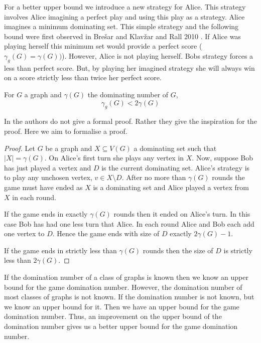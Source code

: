 For a better upper bound we introduce a new strategy for Alice. This strategy involves Alice imagining a perfect play and using this play as a strategy. Alice imagines a minimum dominating set. This simple strategy and the following bound were first observed in Bre\v{s}ar and Klav\v{z}ar and Rall 2010 \cite{BrKlRa2010}. If Alice was playing herself this minimum set would provide a perfect score ($\gamma_g(G)=\gamma(G))$). However, Alice is not playing herself. Bobs strategy forces a less than perfect score. But, by playing her imagined strategy she will always win on a score strictly less than twice her perfect score.

\begin{theorem}\label{thm:gamedomup}
    For $G$ a graph and $\gamma(G)$ the dominating number of $G$,  
    \[\gamma_g(G)<2\gamma(G)\]
\end{theorem}
In \cite{BrKlRa2010} the authors do not give a formal proof. Rather they give the inspiration for the proof. Here we aim to formalise a proof.
\begin{proof}
    Let $G$ be a graph and $X\subseteq V(G)$ a dominating set such that $|X| = \gamma(G)$. On Alice's first turn she plays any vertex in $X$. Now, suppose Bob has just played a vertex and $D$ is the current dominating set. Alice's strategy is to play any unchosen vertex, $v\in X\setminus D$. After no more than $\gamma(G)$ rounds the game must have ended as $X$ is a dominating set and Alice played a vertex from $X$ in each round. 
    
    If the game ends in exactly $\gamma(G)$ rounds then it ended on Alice's turn. In this case Bob has had one less turn that Alice. In each round Alice and Bob each add one vertex to $D$. Hence the game ends with size of $D$ exactly $2\gamma(G) -1$. 
    
    If the game ends in strictly less than $\gamma(G)$ rounds then the size of $D$ is strictly less than $2\gamma(G)$.
\end{proof}

If the domination number of a class of graphs is known then we know an upper bound for the game domination number. However, the domination number of most classes of graphs is not known. If the domination number is not known, but we know an upper bound for it. Then we have an upper bound for the game domination number. Thus, an improvement on the upper bound of the domination number gives us a better upper bound for the game domination number.

